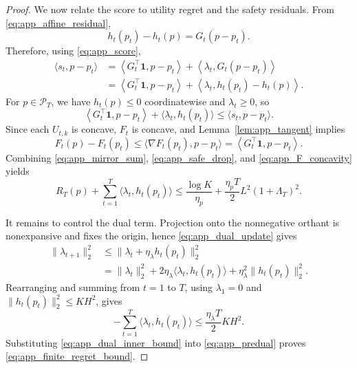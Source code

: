 \begin{proof}
We now relate the score to utility regret and the safety residuals. From \eqref{eq:app_affine_residual},
\begin{equation}
    h_t(p_t)-h_t(p)=G_t(p-p_t).
    \label{eq:app_h_difference}
\end{equation}
Therefore, using \eqref{eq:app_score},
\begin{align}
    \langle s_t,p-p_t\rangle
    &=
    \left\langle G_t^\top\mathbf{1},p-p_t\right\rangle
    +
    \left\langle \lambda_t,G_t(p-p_t)\right\rangle\\
    &=
    \left\langle G_t^\top\mathbf{1},p-p_t\right\rangle
    +
    \left\langle \lambda_t,h_t(p_t)-h_t(p)\right\rangle.
    \label{eq:app_score_decomposition}
\end{align}
For $p\in\mathcal{P}_T$, we have $h_t(p)\le0$ coordinatewise and $\lambda_t\ge0$, so
\begin{equation}
    \left\langle G_t^\top\mathbf{1},p-p_t\right\rangle
    +
    \langle\lambda_t,h_t(p_t)\rangle
    \le
    \langle s_t,p-p_t\rangle.
    \label{eq:app_safe_drop}
\end{equation}
Since each $U_{t,k}$ is concave, $F_t$ is concave, and Lemma~\ref{lem:app_tangent} implies
\begin{equation}
    F_t(p)-F_t(p_t)
    \le
    \langle\nabla F_t(p_t),p-p_t\rangle
    =
    \left\langle G_t^\top\mathbf{1},p-p_t\right\rangle.
    \label{eq:app_F_concavity}
\end{equation}
Combining \eqref{eq:app_mirror_sum}, \eqref{eq:app_safe_drop}, and \eqref{eq:app_F_concavity} yields
\begin{equation}
    R_T(p)
    +
    \sum_{t=1}^T\langle\lambda_t,h_t(p_t)\rangle
    \le
    \frac{\log K}{\eta_p}
    +
    \frac{\eta_p T}{2}L^2(1+\Lambda_T)^2.
    \label{eq:app_predual}
\end{equation}

It remains to control the dual term. Projection onto the nonnegative orthant is nonexpansive and fixes the origin, hence \eqref{eq:app_dual_update} gives
\begin{align}
    \|\lambda_{t+1}\|_2^2
    &\le
    \|\lambda_t+\eta_\lambda h_t(p_t)\|_2^2\\
    &=
    \|\lambda_t\|_2^2
    +2\eta_\lambda\langle\lambda_t,h_t(p_t)\rangle
    +\eta_\lambda^2\|h_t(p_t)\|_2^2.
    \label{eq:app_dual_square}
\end{align}
Rearranging and summing from $t=1$ to $T$, using $\lambda_1=0$ and $\|h_t(p_t)\|_2^2\le KH^2$, gives
\begin{equation}
    -\sum_{t=1}^T\langle\lambda_t,h_t(p_t)\rangle
    \le
    \frac{\eta_\lambda T}{2}KH^2.
    \label{eq:app_dual_inner_bound}
\end{equation}
Substituting \eqref{eq:app_dual_inner_bound} into \eqref{eq:app_predual} proves \eqref{eq:app_finite_regret_bound}.


\end{proof}
